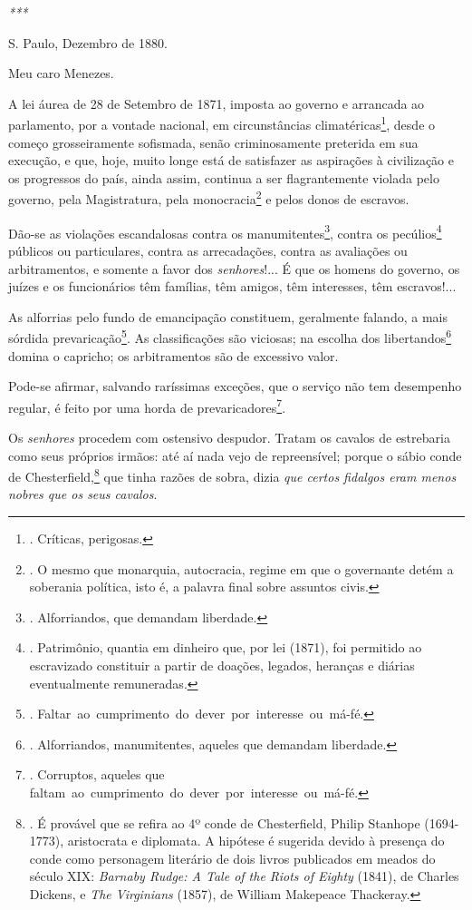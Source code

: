 \emph{***}

S. Paulo, Dezembro de 1880.

Meu caro Menezes.

A lei áurea de 28 de Setembro de 1871, imposta ao governo e arrancada ao
parlamento, por a vontade nacional, em circunstâncias
climatéricas\footnote{. Críticas, perigosas.}, desde o começo
grosseiramente sofismada, senão criminosamente preterida em sua
execução, e que, hoje, muito longe está de satisfazer as aspirações à
civilização e os progressos do país, ainda assim, continua a ser
flagrantemente violada pelo governo, pela Magistratura, pela
monocracia\footnote{. O mesmo que monarquia, autocracia, regime em que o
  governante detém a soberania política, isto é, a palavra final sobre
  assuntos civis.} e pelos donos de escravos.

Dão-se as violações escandalosas contra os manumitentes\footnote{.
  Alforriandos, que demandam liberdade.}, contra os pecúlios\footnote{.
  Patrimônio, quantia em dinheiro que, por lei (1871), foi permitido ao
  escravizado constituir a partir de doações, legados, heranças e
  diárias eventualmente remuneradas.} públicos ou particulares, contra
as arrecadações, contra as avaliações ou arbitramentos, e somente a
favor dos \emph{senhores}!... É que os homens do governo, os juízes e os
funcionários têm famílias, têm amigos, têm interesses, têm escravos!...

As alforrias pelo fundo de emancipação constituem, geralmente falando, a
mais sórdida prevaricação\footnote{.
  Faltar~ao~cumprimento~do~dever~por~interesse~ou~má-fé.}. As
classificações são viciosas; na escolha dos libertandos\footnote{.
  Alforriandos, manumitentes, aqueles que demandam liberdade.} domina o
capricho; os arbitramentos são de excessivo valor.

Pode-se afirmar, salvando raríssimas exceções, que o serviço não tem
desempenho regular, é feito por uma horda de prevaricadores\footnote{.
  Corruptos, aqueles que
  faltam~ao~cumprimento~do~dever~por~interesse~ou~má-fé.}.

Os \emph{senhores} procedem com ostensivo despudor. Tratam os cavalos de
estrebaria como seus próprios irmãos: até aí nada vejo de repreensível;
porque o sábio conde de Chesterfield,\footnote{. É provável que se
  refira ao 4º conde de Chesterfield, Philip Stanhope (1694-1773),
  aristocrata e diplomata. A hipótese é sugerida devido à presença do
  conde como personagem literário de dois livros publicados em meados do
  século XIX: \emph{Barnaby Rudge: A Tale of the Riots of Eighty}
  (1841), de Charles Dickens, e \emph{The Virginians} (1857), de William
  Makepeace Thackeray.} que tinha razões de sobra, dizia \emph{que
certos fidalgos eram menos nobres que os seus cavalos}.

